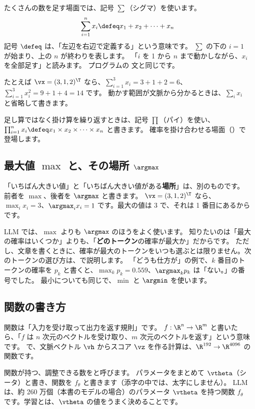 たくさんの数を足す場面では、記号 $\sum$（シグマ）を使います。
\[
\sum_{i=1}^{n} x_i \defeq x_1+x_2+\dots+x_n
\]
記号 $\defeq$ は、「左辺を右辺で定義する」という意味です。
$\sum$ の下の $i=1$ が始まり、上の $n$ が終わりを表します。
「$i$ を 1 から $n$ まで動かしながら、$x_i$ を全部足す」と読みます。
プログラムの  文と同じです。

たとえば $\vx=(3,1,2)^\T$ なら、$\sum_{i=1}^{3}x_i=3+1+2=6$、$\sum_{i=1}^{3}x_i^{2}=9+1+4=14$ です。
動かす範囲が文脈から分かるときは、$\sum_i x_i$ と省略して書きます。

足し算ではなく掛け算を繰り返すときは、記号 $\prod$（パイ）を使い、$\prod_{i=1}^{n}x_i\defeq x_1\times x_2\times\dots\times x_n$ と書きます。
確率を掛け合わせる場面（）で登場します。

\subsection*{最大値 $\max$ と、その場所 $\argmax$}

「いちばん大きい値」と「いちばん大きい値がある\textbf{場所}」は、別のものです。
前者を $\max$、後者を $\argmax$ と書きます。
$\vx=(3,1,2)^\T$ なら、$\max_{i}x_i=3$、$\argmax_{i}x_i=1$ です。最大の値は 3 で、それは 1 番目にあるからです。

LLM では、$\max$ よりも $\argmax$ のほうをよく使います。
知りたいのは「最大の確率はいくつか」よりも、「\textbf{どのトークン}の確率が最大か」だからです。
ただし、文章を書くときに、確率が最大のトークンをいつも選ぶとは限りません。次のトークンの選び方は、で説明します。
「どうも仕方が」の例で、$k$ 番目のトークンの確率を $p_k$ と書くと、$\max_k p_k=0.559$、$\argmax_k p_k$ は「ない。」の番号でした。
最小についても同じで、$\min$ と $\argmin$ を使います。

\subsection*{関数の書き方}

関数は「入力を受け取って出力を返す規則」です。
$f:\R^{n}\to\R^{m}$ と書いたら、「$f$ は $n$ 次元のベクトルを受け取り、$m$ 次元のベクトルを返す」という意味です。
で、文脈ベクトル $\vh$ からスコア $\vz$ を作る計算は、$\R^{192}\to\R^{4096}$ の関数です。

関数が持つ、調整できる数をと呼びます。
パラメータをまとめて $\vtheta$（シータ）と書き、関数を $f_\theta$ と書きます（添字の中では、太字にしません）。
LLM は、約 260 万個（本書のモデルの場合）のパラメータ $\vtheta$ を持つ関数 $f_\theta$ です。学習とは、$\vtheta$ の値をうまく決めることです。

